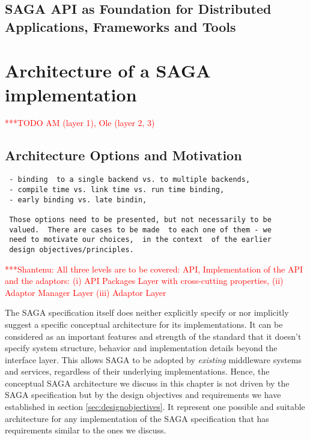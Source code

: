 \documentclass[a4paper,12pt]{article}
\newcommand{\todo}[1]{     {\textcolor{red}  { ***TODO      #1 }}}
\newcommand{\jhanote}[1]{  {\textcolor{red}  { ***Shantenu: #1 }}}
\newcommand{\todo}[1]{}
\newcommand{\jhanote}[1]{}
\begin{document}
 \subsection{SAGA API as Foundation for Distributed Applications,
 Frameworks and Tools}

% 
\section{Architecture of a SAGA implementation} \todo{AM (layer 1), Ole (layer 2, 3)}
\label{sec:architecture}

\subsection{Architecture Options and Motivation}

\begin{verbatim}
 - binding  to a single backend vs. to multiple backends,
 - compile time vs. link time vs. run time binding,
 - early binding vs. late bindin,
 
 Those options need to be presented, but not necessarily to be 
 valued.  There are cases to be made  to each one of them - we 
 need to motivate our choices,  in the context  of the earlier 
 design objectives/principles.
\end{verbatim}

\jhanote{All three levels are to be covered: API, Implementation of
  the API and the adaptors: (i) API Packages Layer with cross-cutting
  properties, (ii) Adaptor Manager Layer (iii) Adaptor Layer}


The SAGA specification itself does neither explicitly specify or nor implicitly
suggest a specific conceptual architecture for its implementations. It can be
considered as an important features and strength of the standard that it
doesn't specify system structure, behavior and implementation details beyond
the interface layer. This allows SAGA to be adopted by \textit{existing}
middleware systems and services, regardless of their underlying
implementations.  Hence, the conceptual SAGA architecture we discuss in this
chapter is not driven by the SAGA specification but by the design objectives
and requirements we have established in section \ref{sec:designobjectives}. It
represent one possible and suitable architecture for any implementation of
the SAGA specification that has requirements similar to the ones we discuss. 
\end{document}
